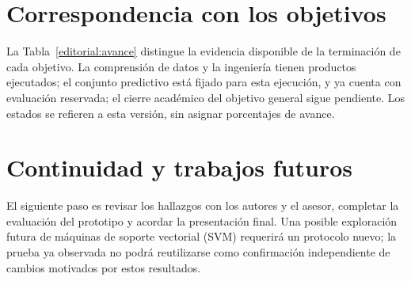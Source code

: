 \section{Correspondencia con los objetivos}
La Tabla~\ref{editorial:avance} distingue la evidencia disponible de la terminación de cada objetivo. La comprensión de datos y la ingeniería tienen productos ejecutados; el conjunto predictivo está fijado para esta ejecución, y ya cuenta con evaluación reservada; el cierre académico del objetivo general sigue pendiente. Los estados se refieren a esta versión, sin asignar porcentajes de avance.

\section{Continuidad y trabajos futuros}
El siguiente paso es revisar los hallazgos con los autores y el asesor, completar la evaluación del prototipo y acordar la presentación final. Una posible exploración futura de máquinas de soporte vectorial (SVM) requerirá un protocolo nuevo; la prueba ya observada no podrá reutilizarse como confirmación independiente de cambios motivados por estos resultados.
